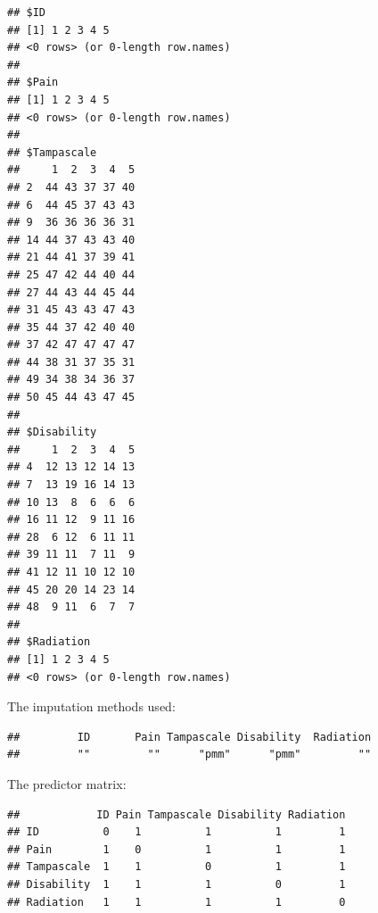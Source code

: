 \documentclass[]{book}
\newenvironment{Shaded}{\begin{snugshade}}{\end{snugshade}}
\newcommand{\OperatorTok}[1]{\textcolor[rgb]{0.81,0.36,0.00}{\textbf{#1}}}
\newcommand{\NormalTok}[1]{#1}
\begin{document}
\begin{Shaded}
\end{Shaded}

\begin{verbatim}
## $ID
## [1] 1 2 3 4 5
## <0 rows> (or 0-length row.names)
## 
## $Pain
## [1] 1 2 3 4 5
## <0 rows> (or 0-length row.names)
## 
## $Tampascale
##     1  2  3  4  5
## 2  44 43 37 37 40
## 6  44 45 37 43 43
## 9  36 36 36 36 31
## 14 44 37 43 43 40
## 21 44 41 37 39 41
## 25 47 42 44 40 44
## 27 44 43 44 45 44
## 31 45 43 43 47 43
## 35 44 37 42 40 40
## 37 42 47 47 47 47
## 44 38 31 37 35 31
## 49 34 38 34 36 37
## 50 45 44 43 47 45
## 
## $Disability
##     1  2  3  4  5
## 4  12 13 12 14 13
## 7  13 19 16 14 13
## 10 13  8  6  6  6
## 16 11 12  9 11 16
## 28  6 12  6 11 11
## 39 11 11  7 11  9
## 41 12 11 10 12 10
## 45 20 20 14 23 14
## 48  9 11  6  7  7
## 
## $Radiation
## [1] 1 2 3 4 5
## <0 rows> (or 0-length row.names)
\end{verbatim}

The imputation methods used:

\begin{Shaded}
\end{Shaded}

\begin{verbatim}
##         ID       Pain Tampascale Disability  Radiation 
##         ""         ""      "pmm"      "pmm"         ""
\end{verbatim}

The predictor matrix:

\begin{Shaded}
\end{Shaded}

\begin{verbatim}
##            ID Pain Tampascale Disability Radiation
## ID          0    1          1          1         1
## Pain        1    0          1          1         1
## Tampascale  1    1          0          1         1
## Disability  1    1          1          0         1
## Radiation   1    1          1          1         0
\end{verbatim}
\end{document}
